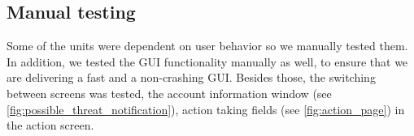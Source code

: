 \subsection{Manual testing}
Some of the units were dependent on user behavior so we manually tested them. In addition, we tested the 
GUI functionality manually as well, to ensure that we are delivering a fast and a non-crashing GUI.
Besides those, the switching between screens was tested, the account information window (see \ref{fig:possible_threat_notification}), action taking fields (see \ref{fig:action_page}) in the action
screen.



